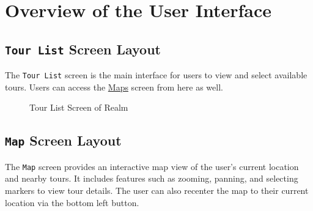 \documentclass[12pt, titlepage]{article}
\newcommand{\progname}{Realm}
\begin{document}

\clearpage
\section{Overview of the User Interface}
\subsection{\texttt{Tour List} Screen Layout}
The \texttt{Tour List} screen is the main interface for users to view and select available tours. Users can access the \hyperref[fig:maps]{Maps} screen from here as well.

\begin{figure}[ht!]
    \setlength{\fboxrule}{0.1mm}
    \centering
    \caption{Tour List Screen of \progname{}}
    \label{fig:tours}
\end{figure}

\newpage
\subsection{\texttt{Map} Screen Layout}
The \texttt{Map} screen provides an interactive map view of the user's current location and nearby tours. It includes features such as zooming, panning, and selecting markers to view tour details. The user can also recenter the map to their current location via the bottom left button.
\end{document}
